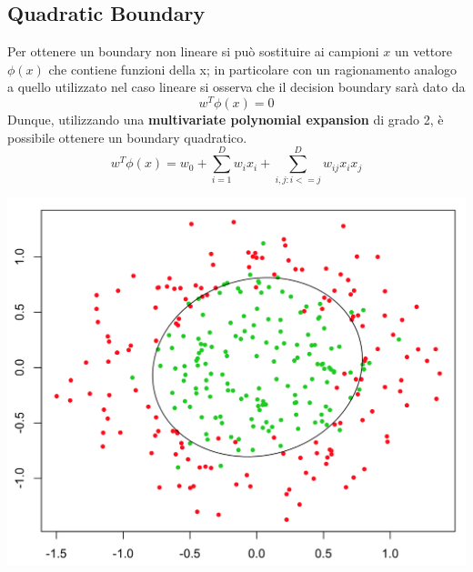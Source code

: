 \documentclass[a4paper,8pt]{article}
\newenvironment{Figure}
  {\par\medskip\noindent\minipage{\linewidth}}
  {\endminipage\par\medskip}
\begin{document}
\begin{multicols}{2}
\subsection{Quadratic Boundary}
Per ottenere un boundary non lineare si può sostituire ai campioni $x$ un vettore $\phi(x)$ che contiene funzioni della x; in particolare con un ragionamento analogo a quello utilizzato nel caso lineare si osserva che il decision boundary sarà dato da
\begin{equation}
w^T\phi(x) = 0
\end{equation}
Dunque, utilizzando una \textbf{multivariate polynomial expansion} di grado 2, è possibile ottenere un boundary quadratico.
\begin{equation}
w^T\phi(x) = w_0 + \sum_{i=1}^{D} w_i x_i + \sum_{i,j : i<=j}^{D} w_{ij}x_{i}x_j 
\end{equation}
\begin{Figure}
 \centering
 \includegraphics[width=\linewidth]{quadratic}
\end{Figure}



\end{multicols}
\end{document}
